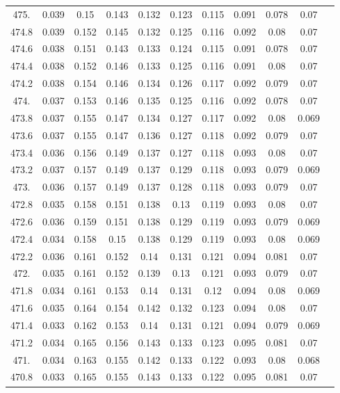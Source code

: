 \documentclass[12pt]{ctexart}
\numberwithin{equation}{section}
\begin{document}
\begin{longtable}{ccccccccccc}
475.	&	0.039	&	0.15	&	0.143	&	0.132	&	0.123	&	0.115	&	0.091	&	0.078	&	0.07	\\
474.8	&	0.039	&	0.152	&	0.145	&	0.132	&	0.125	&	0.116	&	0.092	&	0.08	&	0.07	\\
474.6	&	0.038	&	0.151	&	0.143	&	0.133	&	0.124	&	0.115	&	0.091	&	0.078	&	0.07	\\
474.4	&	0.038	&	0.152	&	0.146	&	0.133	&	0.125	&	0.116	&	0.091	&	0.08	&	0.07	\\
474.2	&	0.038	&	0.154	&	0.146	&	0.134	&	0.126	&	0.117	&	0.092	&	0.079	&	0.07	\\
474.	&	0.037	&	0.153	&	0.146	&	0.135	&	0.125	&	0.116	&	0.092	&	0.078	&	0.07	\\
473.8	&	0.037	&	0.155	&	0.147	&	0.134	&	0.127	&	0.117	&	0.092	&	0.08	&	0.069	\\
473.6	&	0.037	&	0.155	&	0.147	&	0.136	&	0.127	&	0.118	&	0.092	&	0.079	&	0.07	\\
473.4	&	0.036	&	0.156	&	0.149	&	0.137	&	0.127	&	0.118	&	0.093	&	0.08	&	0.07	\\
473.2	&	0.037	&	0.157	&	0.149	&	0.137	&	0.129	&	0.118	&	0.093	&	0.079	&	0.069	\\
473.	&	0.036	&	0.157	&	0.149	&	0.137	&	0.128	&	0.118	&	0.093	&	0.079	&	0.07	\\
472.8	&	0.035	&	0.158	&	0.151	&	0.138	&	0.13	&	0.119	&	0.093	&	0.08	&	0.07	\\
472.6	&	0.036	&	0.159	&	0.151	&	0.138	&	0.129	&	0.119	&	0.093	&	0.079	&	0.069	\\
472.4	&	0.034	&	0.158	&	0.15	&	0.138	&	0.129	&	0.119	&	0.093	&	0.08	&	0.069	\\
472.2	&	0.036	&	0.161	&	0.152	&	0.14	&	0.131	&	0.121	&	0.094	&	0.081	&	0.07	\\
472.	&	0.035	&	0.161	&	0.152	&	0.139	&	0.13	&	0.121	&	0.093	&	0.079	&	0.07	\\
471.8	&	0.034	&	0.161	&	0.153	&	0.14	&	0.131	&	0.12	&	0.094	&	0.08	&	0.069	\\
471.6	&	0.035	&	0.164	&	0.154	&	0.142	&	0.132	&	0.123	&	0.094	&	0.08	&	0.07	\\
471.4	&	0.033	&	0.162	&	0.153	&	0.14	&	0.131	&	0.121	&	0.094	&	0.079	&	0.069	\\
471.2	&	0.034	&	0.165	&	0.156	&	0.143	&	0.133	&	0.123	&	0.095	&	0.081	&	0.07	\\
471.	&	0.034	&	0.163	&	0.155	&	0.142	&	0.133	&	0.122	&	0.093	&	0.08	&	0.068	\\
470.8	&	0.033	&	0.165	&	0.155	&	0.143	&	0.133	&	0.122	&	0.095	&	0.081	&	0.07	\\

\end{longtable}
\end{document}

